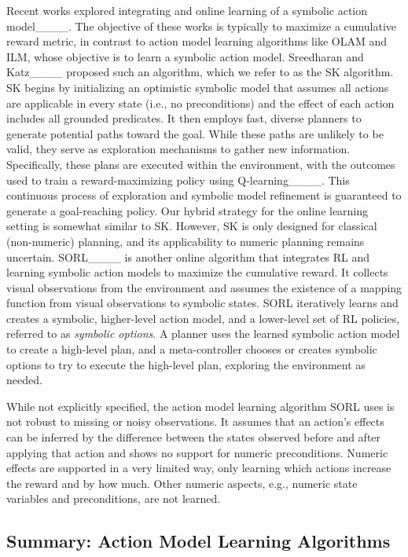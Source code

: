 Recent works explored integrating \rl and online learning of a symbolic action model____. 
The objective of these works is typically to maximize a cumulative reward metric, in contrast to action model learning algorithms like OLAM and ILM, whose objective is to learn a symbolic action model.
Sreedharan and Katz____ proposed such an algorithm, which we refer to as the SK algorithm. SK begins by initializing an optimistic symbolic model that assumes all actions are applicable in every state (i.e., no preconditions) and the effect of each action includes all grounded predicates. It then employs fast, diverse planners to generate potential paths toward the goal. While these paths are unlikely to be valid, they serve as exploration mechanisms to gather new information. 
Specifically, these plans are executed within the environment, with the outcomes used to train a reward-maximizing policy using Q-learning____.
This continuous process of exploration and symbolic model refinement is guaranteed to generate a goal-reaching policy. Our hybrid strategy for the online learning setting is somewhat similar to SK. However, SK is only designed for classical (non-numeric) planning, and its applicability to numeric planning remains uncertain. 
SORL____ is another online algorithm that integrates RL and learning symbolic action models to maximize the cumulative reward. 
It collects visual observations from the environment and assumes the existence of a mapping function from visual observations to symbolic states. 
SORL iteratively learns and creates 
a symbolic, higher-level action model, 
and a lower-level set of RL policies, referred to as \emph{symbolic options}. 
A planner uses the learned symbolic action model to create a high-level plan, and a meta-controller chooses or creates symbolic options to try to execute the high-level plan, exploring the environment as needed. 

While not explicitly specified, the action model learning algorithm SORL uses is not robust to missing or noisy observations. It assumes that an action's effects can be inferred by the difference between the states observed before and after applying that action and shows no support for numeric preconditions. Numeric effects are supported in a very limited way, only learning which actions increase the reward and by how much. Other numeric aspects, e.g., numeric state variables and preconditions, are not learned.


\subsection{Summary: Action Model Learning Algorithms}
\label{sec:summary-action-model-learning}

